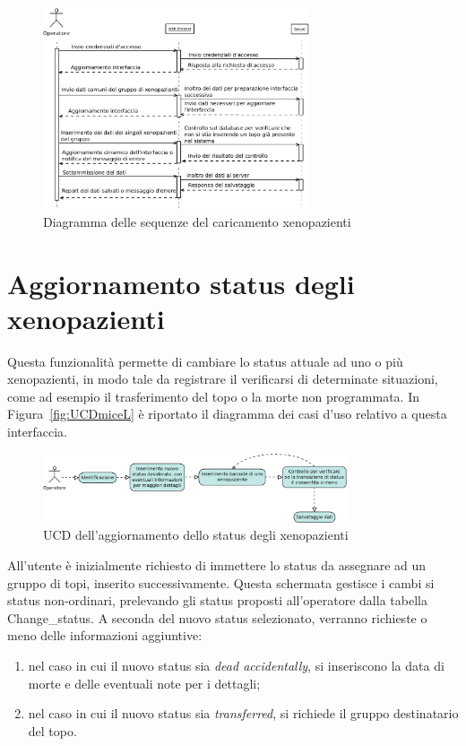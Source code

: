 \begin{figure}[h]
\begin{center}
\includegraphics[width=0.7\textwidth]{./Figure/SDmiceloading}
\end{center}
\caption{Diagramma delle sequenze del caricamento xenopazienti\label{fig:SDmiceL}}
\end{figure}

\newpage

\section{Aggiornamento status degli xenopazienti}

Questa funzionalit\`a permette di cambiare lo status attuale ad uno o pi\`u xenopazienti, in modo tale da registrare il verificarsi di determinate situazioni, come ad esempio il trasferimento del topo o la morte non programmata. In Figura~\ref{fig:UCDmiceL} \`e riportato il diagramma dei casi d'uso relativo a questa interfaccia.

\begin{figure}[h]
\begin{center}
\includegraphics[width=0.8\textwidth]{./Figure/UCDchangestatus}
\end{center}
\caption{UCD dell'aggiornamento dello status degli xenopazienti\label{fig:UCDcs}}
\end{figure}

All'utente \`e inizialmente richiesto di immettere lo status da assegnare ad un gruppo di topi, inserito successivamente. Questa schermata gestisce i cambi si status non-ordinari, prelevando gli status proposti all'operatore dalla tabella Change\_status.
A seconda del nuovo status selezionato, verranno richieste o meno delle informazioni aggiuntive:
\begin{enumerate} 
	\item nel caso in cui il nuovo status sia \textit{dead accidentally}, si inseriscono la data di morte e delle eventuali note per i dettagli;
	\item nel caso in cui il nuovo status sia \textit{transferred}, si richiede il gruppo destinatario del topo.
\end{enumerate}

